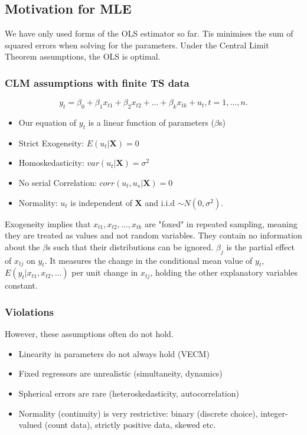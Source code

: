 \documentclass[11pt]{article}
\begin{document}
\subsection{Motivation for MLE}

We have only used forms of the OLS estimator so far. Tis minimises the sum of squared errors when solving for the parameters. Under the Central Limit Theorem assumptions, the OLS is optimal.

\subsubsection{CLM assumptions with finite TS data}

\begin{equation}
y_t=\beta_0+\beta_1 x_{t 1}+\beta_2 x_{t 2}+\ldots+\beta_k x_{t k}+u_t, t=1, \ldots, n .
\end{equation}

\begin{itemize}
    \item Our equation of $y_t$ is a linear function of parameters ($\beta$s)
    \item Strict Exogeneity: $E(u_t|\boldsymbol{X})=0$
    \item Homoskedasticity: $var(u_t|\boldsymbol{X})=\sigma^2$
    \item No serial Correlation: $corr(u_t,u_s|\boldsymbol{X})=0$
    \item Normality: $u_t$ is independent of $\boldsymbol{X}$ and i.i.d $\sim N(0,\sigma^2)$.
\end{itemize}


Exogeneity implies that $x_{t1}, x_{t2}, \ldots, x_{tk}$ are "foxed" in repeated sampling, meaning they are treated as values and not random variables. They contain no information about the $\beta$s such that their distributions can be ignored. $\beta_j$ is the partial effect of $x_{tj}$ on $y_t$. It measures the change in the conditional mean value of $y_t$, $E(y_t|x_{t1},x_{t2}, \ldots)$ per unit change in $x_{tj}$, holding the other explanatory variables constant.

\subsubsection{Violations}

However, these assumptions often do not hold.
\begin{itemize}
    \item Linearity in parameters do not always hold (VECM)
    \item Fixed regressors are unrealistic (simultaneity, dynamics)
    \item Spherical errors are rare (heteroskedasticity, autocorrelation)
    \item Normality (continuity) is very restrictive: binary (discrete choice), integer-valued (count data), strictly positive data, skewed etc.
\end{itemize}
\end{document}
